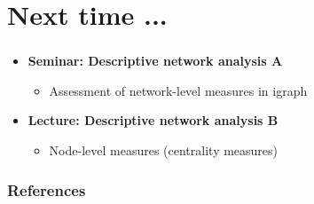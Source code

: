 \documentclass[8pt]{beamer}
\begin{document}
\section*{Next time ...}


\bgroup
{}
\begin{frame}[plain]{}
\begin{center}
\color{white}{\Huge\insertsection}
\end{center}
\end{frame}
\egroup


\begin{frame}
\frametitle{\insertsection}

\begin{itemize}

\item 	\textbf{Seminar: Descriptive network analysis A}
	\begin{itemize}
	\item Assessment of network-level measures in igraph
	\end{itemize}	
	

\medskip
\medskip

\item 	\textbf{Lecture: Descriptive network analysis B}
	\begin{itemize}
	\item Node-level measures (centrality measures)
	\end{itemize}
	
	

		
\end{itemize}

\end{frame}






\begin{frame}[allowframebreaks]
\frametitle{References}
\tiny


\end{frame}
\end{document}
